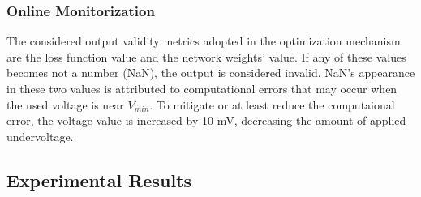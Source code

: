 




\subsubsection{Online Monitorization}

The considered output validity metrics adopted in the optimization mechanism are the loss function value and the network weights' value. If any of these values becomes not a number (NaN), the output is considered invalid. NaN's appearance in these two values is attributed to computational errors that may occur when the used voltage is near $V_{min}$. To mitigate or at least reduce the computaional error, the voltage value is increased by 10 mV, decreasing the amount of applied undervoltage.



\subsection{Experimental Results}

